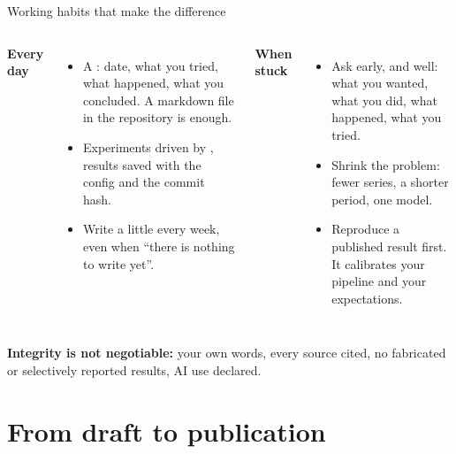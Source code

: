 \documentclass[aspectratio=169,11pt,t]{beamer}
\begin{document}
\begin{frame}{Working habits that make the difference}
  \begin{columns}[T,onlytextwidth]
    \textbf{Every day}
    \begin{itemize}
      \item A : date, what you tried, what happened, what you concluded.
            A markdown file in the repository is enough.
      \item Experiments driven by , results saved with the config and
            the commit hash.
      \item Write a little every week, even when ``there is nothing to write yet''.
    \end{itemize}
    \textbf{When stuck}
    \begin{itemize}
      \item Ask early, and well: what you wanted, what you did, what happened, what you tried.
      \item Shrink the problem: fewer series, a shorter period, one model.
      \item Reproduce a published result first. It calibrates your pipeline and your expectations.
    \end{itemize}
  \end{columns}

  \smallskip
  \textbf{Integrity is not negotiable:} your own words, every source cited, no fabricated or
  selectively reported results, AI use declared.
\end{frame}

\section{From draft to publication}
\end{document}
